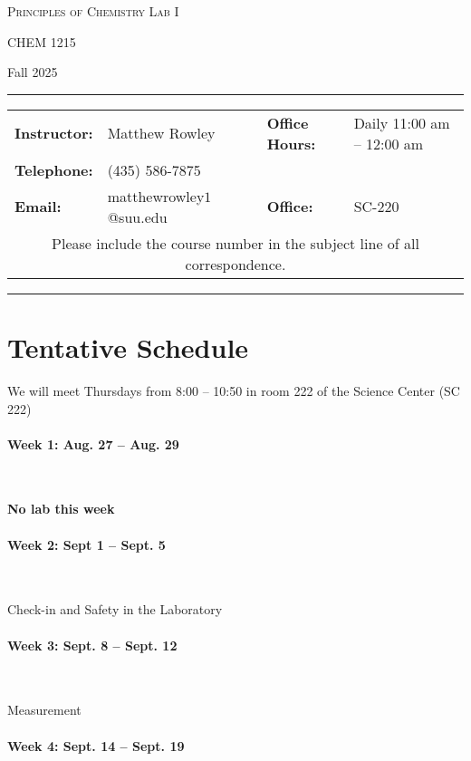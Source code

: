 \documentclass[12pt, letterpaper]{article}
\begin{document}
	\begin{center}
		{\Large \textsc{Principles of Chemistry Lab I}}
		
		CHEM 1215
	\end{center}
	\begin{center}
		{\large Fall 2025}
	\end{center}
	\begin{center}
		\rule{0.99\textwidth}{0.4pt}
		\begin{tabular}{llcll}
			\textbf{Instructor:} & Matthew Rowley           &  & \textbf{Office Hours:} & Daily 11:00 am -- 12:00 am \\
			\textbf{Telephone:}  & (435) 586-7875           &  &                        & \\
			\textbf{Email:}      & matthewrowley$1$@suu.edu &  & \textbf{Office:}       & SC-220                   \\
			\multicolumn{5}{c}{Please include the course number in the subject line of all correspondence.}
		\end{tabular}
		\rule{0.99\textwidth}{0.4pt}
	\end{center}

\section*{Tentative Schedule}
We will meet Thursdays from 8:00 -- 10:50 in room 222 of the Science Center (SC 222) 

\paragraph*{Week 1: Aug. 27 -- Aug. 29}~

\textbf{No lab this week}

\paragraph{Week 2: Sept 1 -- Sept. 5}~

Check-in and Safety in the Laboratory

\paragraph{Week 3: Sept. 8 -- Sept. 12}~

Measurement

\paragraph{Week 4: Sept. 14 -- Sept. 19}~
\end{document}
